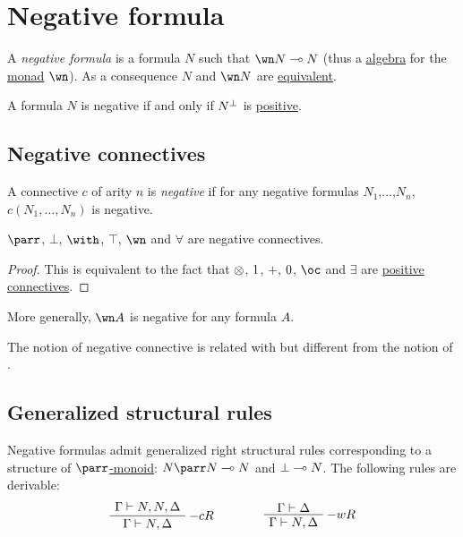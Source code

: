 \section{Negative formula}\label{negative-formula}

A \emph{negative formula} is a formula \(N\) such that \(\wn N\limp N\)
(thus a \href{https://en.wikipedia.org/wiki/F-algebra}{algebra} for the
\href{https://en.wikipedia.org/wiki/Monad_(category_theory)}{monad} \(\wn\)). As a consequence \(N\) and \(\wn N\) are \hyperref[equivalences]{equivalent}.

A formula \(N\) is negative if and only if \(N^\bot\) is \hyperref[positive-formula]{positive}.

\subsection{Negative connectives}\label{negative-connectives}

A connective \(c\) of arity \(n\) is \emph{negative} if for any negative
formulas \(N_1\),...,\(N_n\), \(c(N_1,\dots,N_n)\) is negative.

\begin{proposition}
$\parr$, $\bot$, $\with$, $\top$, $\wn$ and $\forall$ are negative connectives.
\end{proposition}

\begin{proof}
This is equivalent to the fact that $\otimes$, $1$, $\plus$, $0$, $\oc$ and $\exists$ are \hyperref[positive-formula]{positive connectives}.
\end{proof}

More generally, \(\wn A\) is negative for any formula \(A\).

The notion of negative connective is related with but different from the
notion of .

\subsection{Generalized structural rules}\label{generalized-structural-rules}

Negative formulas admit generalized right structural rules corresponding
to a structure of
\href{https://en.wikipedia.org/wiki/Monoid_(category_theory)}{\(\parr\)-monoid}:
\(N\parr N\limp N\) and \(\bot\multimap N\).
The following rules are derivable:
\begin{equation*}
\AxRule{\Gamma\vdash N,N,\Delta}
\LabelRule{- c R}
\UnaRule{\Gamma\vdash N,\Delta}
\DisplayProof
\qquad\qquad
\AxRule{\Gamma\vdash\Delta}
\LabelRule{- w R}
\UnaRule{\Gamma\vdash N,\Delta}
\DisplayProof
\end{equation*}

